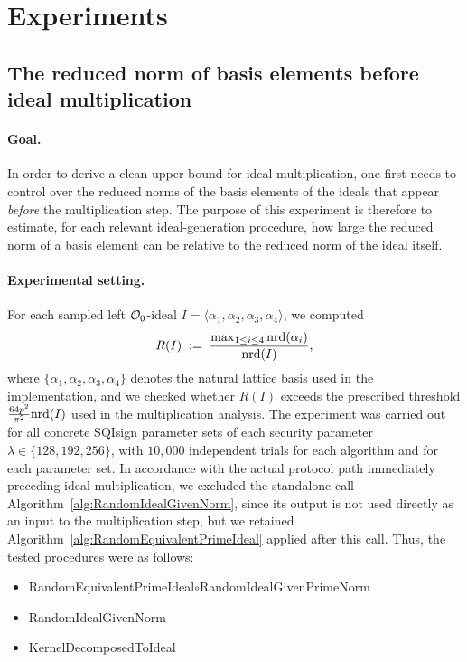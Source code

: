 \section{Experiments}
\label{sec:experiments}

\subsection{The reduced norm of basis elements before ideal multiplication}
\label{subsec:exp-basis}

\paragraph{Goal.}
In order to derive a clean upper bound for ideal multiplication, one first needs to control over the reduced norms of the basis elements of the ideals that appear \emph{before} the multiplication step. The purpose of this experiment is therefore to estimate, for each relevant ideal-generation procedure, how large the reduced norm of a basis element can be relative to the reduced norm of the ideal itself.

\paragraph{Experimental setting.}
For each sampled left $\mathcal{O}_0$-ideal \(I=\langle \alpha_1,\alpha_2,\alpha_3,\alpha_4\rangle\), we computed
\[
R(I) \;:=\; \frac{\max_{1 \le i \le 4} \mathrm{nrd}(\alpha_i)}{\mathrm{nrd}(I)},
\]
where \(\{\alpha_1,\alpha_2,\alpha_3,\alpha_4\}\) denotes the natural lattice basis used in the implementation, and we checked whether \(R(I)\) exceeds the prescribed threshold \(\frac{64p^2}{\pi^2}\mathrm{nrd}(I)\) used in the multiplication analysis. The experiment was carried out for all concrete SQIsign parameter sets of each security parameter $\lambda\in\{128,192,256\}$, with \(10{,}000\) independent trials for each algorithm and for each parameter set. In accordance with the actual protocol path immediately preceding ideal multiplication, we excluded the standalone call Algorithm~\ref{alg:RandomIdealGivenNorm}, since its output is not used directly as an input to the multiplication step, but we retained Algorithm~\ref{alg:RandomEquivalentPrimeIdeal} applied after this call. Thus, the tested procedures were as follows:
\begin{itemize}
\item \textsf{RandomEquivalentPrimeIdeal}$\circ$\textsf{RandomIdealGivenPrimeNorm}
\item \textsf{RandomIdealGivenNorm}
\item \textsf{KernelDecomposedToIdeal}
\end{itemize}

